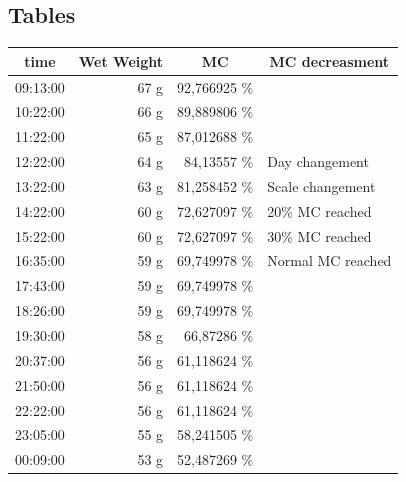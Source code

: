 \subsection{Tables}

\begin {table}[th]
\centering
\begin{tabular}{||r|r|r||r|}
	\hline
	\cline{1-3}\multicolumn{1}{|c|}{time} & \multicolumn{1}{c|}{Wet Weight} & \multicolumn{1}{c|}{MC } & \multicolumn{1}{c|}{MC decreasment} \\
	\hline
	\hline
	\cline{1-3}\rowcolor[rgb]{ .647,  .647,  .647} 09:13:00 & \multicolumn{1}{|r}{\cellcolor[rgb]{ 1,  1,  1}67 g} &\cellcolor[rgb]{ 1,  1,  1}92,766925 \% & \multicolumn{1}{|r}{\cellcolor[rgb]{ 1,  1,  1}} \\
	\cline{1-3}10:22:00 & 66 g  & 89,889806 \% & \multicolumn{1}{r}{} \\
	\cline{1-3}11:22:00 & 65 g  & 87,012688 \% & \multicolumn{1}{r}{} \\
	\hline
	12:22:00 & 64 g  & 84,13557 \% & \multicolumn{1}{l|}{\cellcolor[rgb]{ .647,  .647,  .647}Day changement} \\
	\hline
	13:22:00 & 63 g  & 81,258452 \% & \multicolumn{1}{l|}{\cellcolor[rgb]{ .608,  .761,  .902}Scale changement} \\
	\hline
	14:22:00 & 60 g  & 72,627097 \% & \multicolumn{1}{l|}{\cellcolor[rgb]{ 0,  .69,  .941}20\% MC reached} \\
	\hline
	15:22:00 & 60 g  & 72,627097 \% & \multicolumn{1}{l|}{\cellcolor[rgb]{ 0,  .439,  .753}30\% MC reached} \\
	\hline
	16:35:00 & 59 g  & 69,749978 \% & \multicolumn{1}{l|}{\cellcolor[rgb]{ 1,  .753,  0}Normal MC reached} \\
	\hline
	17:43:00 & 59 g  & 69,749978 \% & \multicolumn{1}{r}{} \\
	\cline{1-3}18:26:00 & 59 g  & 69,749978 \% & \multicolumn{1}{r}{} \\
	\cline{1-3}19:30:00 & 58 g  & 66,87286 \% & \multicolumn{1}{r}{} \\
	\cline{1-3}20:37:00 & 56 g  & 61,118624 \% & \multicolumn{1}{r}{} \\
	\cline{1-3}21:50:00 & 56 g  & 61,118624 \% & \multicolumn{1}{r}{} \\
	\cline{1-3}22:22:00 & 56 g  & 61,118624 \% & \multicolumn{1}{r}{} \\
	\cline{1-3}23:05:00 & 55 g  & 58,241505 \% & \multicolumn{1}{r}{} \\
	\cline{1-3}00:09:00 & 53 g  & 52,487269 \% & \multicolumn{1}{r}{} \\

\end{tabular}
\end{table}
